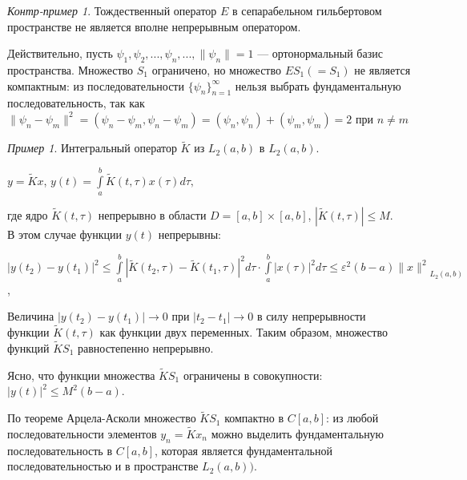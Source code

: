 \documentclass[12pt,a4paper,titlepage, oneside]{book}
\theoremstyle{definition}
\theoremstyle{plain}
\theoremstyle{remark}
\theoremstyle{remark}
\newtheorem*{example}{Пример}
\theoremstyle{remark}
\newtheorem*{cexample}{Контр-пример}
\theoremstyle{plain}
\theoremstyle{plain}
\begin{document}
\begin{cexample}Тождественный оператор $E$ в сепарабельном гильбертовом пространстве не является вполне непрерывным оператором.

Действительно, пусть $\psi_1,\psi_2,...,\psi_n,..., \lVert\psi_n\rVert =1$ --- ортонормальный базис пространства. Множество $S_1$ ограничено, но множество $ES_1 (=S_1)$ не является компактным: из последовательности $\lbrace \psi_n \rbrace_{n=1}^{\infty}$ нельзя выбрать фундаментальную последовательность, так как $\lVert\psi_n - \psi_m \rVert ^2=(\psi_n - \psi_m, \psi_n - \psi_m)= (\psi_n,\psi_n)+ (\psi_m,\psi_m)=2$ при $n \neq m$
\end{cexample}
\begin{example}Интегральный оператор $\widetilde{K}$ из $L_2(a,b)$ в $L_2(a,b)$.
\begin{center}
$y=\widetilde{K}x$, $y(t)=\int\limits_a^b \widetilde{K}(t, \tau)x(\tau)d\tau ,$\\
\end{center}
где ядро $\widetilde{K}(t, \tau)$ непрерывно в области $D=[a,b]\times[a,b]$, $|\widetilde{K}(t, \tau)|\leq M$.\\

В этом случае функции $y(t)$ непрерывны:

\begin{center}
$|y(t_2)-y(t_1)|^2\leq \int\limits_a^b |\widetilde{K}(t_2, \tau)-\widetilde{K}(t_1, \tau)|^2d\tau \cdot \int\limits_a^b |x(\tau)|^2 d\tau \leq \varepsilon^2 (b-a){\lVert x\rVert^2}_{L_2(a,b)}$,\\
\end{center}
Величина $|y(t_2)-y(t_1)|\to 0$ при $|t_2-t_1|\to 0$ в силу непрерывности функции $\widetilde{K}(t, \tau)$ как функции двух переменных. Таким образом, множество функций $\widetilde{K} S_1$ равностепенно непрерывно.

Ясно, что функции множества $\widetilde{K} S_1$ ограничены в совокупности: $|y(t)|^2 \leq M^2 (b-a)$.

По теореме Арцела-Асколи множество $\widetilde{K} S_1$ компактно в $C[a,b]$: из любой последовательности элементов $y_n=\widetilde{K} x_n$ можно выделить фундаментальную последовательность в $C[a,b]$, которая является фундаментальной последовательностью и в пространстве $L_2 (a,b))$.
\end{example}
\end{document}
